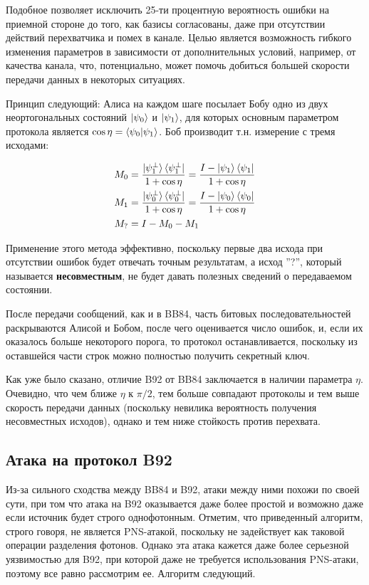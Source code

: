 \documentclass[a4paper, 12pt]{article}
\begin{document}
Подобное позволяет исключить 25-ти процентную вероятность ошибки на приемной стороне до того, как базисы согласованы, даже при отсутствии действий перехватчика и помех в канале. Целью является возможность гибкого изменения параметров в зависимости от дополнительных условий, например, от качества канала, что, потенциально, может помочь добиться большей скорости передачи данных в некоторых ситуациях.

Принцип следующий: Алиса на каждом шаге посылает Бобу одно из двух неортогональных состояний $\ket{\psi_0}$ и $\ket{\psi_1}$, для которых основным параметром протокола является $\cos\eta = \braket{\psi_0|\psi_1}$. Боб производит т.н. измерение с тремя исходами:

\begin{align}
	M_0 &= \frac{\ket{\psi_1^\perp}\bra{\psi_1^\perp}}{1 + \cos\eta} = \frac{I - \ket{\psi_1}\bra{\psi_1}}{1 + \cos\eta} \\ 
	M_1 &= \frac{\ket{\psi_0^\perp}\bra{\psi_0^\perp}}{1 + \cos\eta} = \frac{I - \ket{\psi_0}\bra{\psi_0}}{1 + \cos\eta} \\
	M_? &= I - M_0 - M_1
\end{align}

Применение этого метода эффективно, поскольку первые два исхода при отсутствии ошибок будет отвечать точным результатам, а исход ''?'', который называется \textbf{несовместным}, не будет давать полезных сведений о передаваемом состоянии.

После передачи сообщений, как и в BB84, часть битовых последовательностей раскрываются Алисой и Бобом, после чего оценивается число ошибок, и, если их оказалось больше некоторого порога, то протокол останавливается, поскольку из оставшейся части строк можно полностью получить секретный ключ.

Как уже было сказано, отличие B92 от BB84 заключается в наличии параметра $\eta$. Очевидно, что чем ближе $\eta$ к $\pi/2$, тем больше совпадают протоколы и тем выше скорость передачи данных (поскольку невилика вероятность получения несовместных исходов), однако и тем ниже стойкость против перехвата.

\subsection{Атака на протокол B92}

Из-за сильного сходства между BB84 и B92, атаки между ними похожи по своей сути, при том что атака на B92 оказывается даже более простой и возможно даже если источник будет строго однофотонным. Отметим, что приведенный алгоритм, строго говоря, не является PNS-атакой, поскольку не задействует как таковой операции разделения фотонов. Однако эта атака кажется даже более серьезной уязвимостью для B92, при которой даже не требуется использования PNS-атаки, поэтому все равно рассмотрим ее. Алгоритм следующий.
\end{document}
